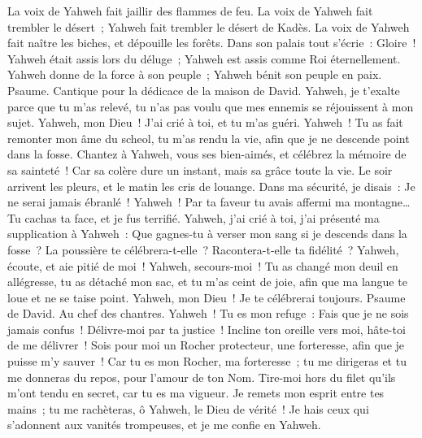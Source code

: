 \begin{multicols}{2}
La voix de Yahweh fait jaillir des flammes de feu.
La voix de Yahweh fait trembler le désert~; Yahweh fait trembler le désert de Kadès.
La voix de Yahweh fait naître les biches, et dépouille les forêts. Dans son palais tout s'écrie~: Gloire~!
Yahweh était assis lors du déluge~; Yahweh est assis comme Roi éternellement.
Yahweh donne de la force à son peuple~; Yahweh bénit son peuple en paix.
\VerseOne{}Psaume. Cantique pour la dédicace de la maison de David.
Yahweh, je t'exalte parce que tu m'as relevé, tu n'as pas voulu que mes ennemis se réjouissent à mon sujet.
Yahweh, mon Dieu~! J'ai crié à toi, et tu m'as guéri.
Yahweh~! Tu as fait remonter mon âme du scheol, tu m'as rendu la vie, afin que je ne descende point dans la fosse.
Chantez à Yahweh, vous ses bien-aimés, et célébrez la mémoire de sa sainteté~!
Car sa colère dure un instant, mais sa grâce toute la vie. Le soir arrivent les pleurs, et le matin les cris de louange.
Dans ma sécurité, je disais~: Je ne serai jamais ébranlé~!
Yahweh~! Par ta faveur tu avais affermi ma montagne… Tu cachas ta face, et je fus terrifié.
Yahweh, j'ai crié à toi, j'ai présenté ma supplication à Yahweh~:
Que gagnes-tu à verser mon sang si je descends dans la fosse~? La poussière te célébrera-t-elle~? Racontera-t-elle ta fidélité~?
Yahweh, écoute, et aie pitié de moi~! Yahweh, secours-moi~!
Tu as changé mon deuil en allégresse, tu as détaché mon sac, et tu m'as ceint de joie,
afin que ma langue te loue et ne se taise point. Yahweh, mon Dieu~! Je te célébrerai toujours.
\VerseOne{}Psaume de David. Au chef des chantres.
Yahweh~! Tu es mon refuge~: Fais que je ne sois jamais confus~! Délivre-moi par ta justice~!
Incline ton oreille vers moi, hâte-toi de me délivrer~! Sois pour moi un Rocher protecteur, une forteresse, afin que je puisse m'y sauver~!
Car tu es mon Rocher, ma forteresse~; tu me dirigeras et tu me donneras du repos, pour l'amour de ton Nom.
Tire-moi hors du filet qu'ils m'ont tendu en secret, car tu es ma vigueur.
Je remets mon esprit entre tes mains~; tu me rachèteras, ô Yahweh, le Dieu de vérité~!
Je hais ceux qui s'adonnent aux vanités trompeuses, et je me confie en Yahweh.

\end{multicols}
